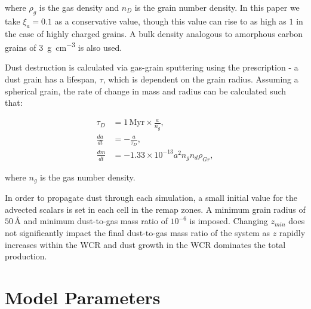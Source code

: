 \noindent
where $\rho_g$ is the gas density and $n_D$ is the grain number density.
In this paper we take $\xi_a = 0.1$ as a conservative value, though this value can rise to as high as $1$ in the case of highly charged grains.
A bulk density analogous to amorphous carbon grains of \SI{3}{\gram\per\centi\metre\cubed} is also used.

Dust destruction is calculated via gas-grain sputtering using the \textcite{draine_destruction_1979} prescription - a dust grain has a lifespan, $\tau$, which is dependent on the grain radius.
Assuming a spherical grain, the rate of change in mass and radius can be calculated such that:

\begin{subequations}
  \begin{align}
           \tau_D & = 1 \, \text{Myr} \times \frac{a}{n_g} , \\
    \frac{da}{dt} & = - \frac{a}{\tau_D} , \\
    \frac{dm}{dt} & = -1.33 \times 10^{-13} a^2 n_g n_d \rho_{Gr} ,
  \end{align}
\end{subequations}

\noindent
where $n_g$ is the gas number density.


In order to propagate dust through each simulation, a small initial value for the advected scalars is set in each cell in the remap zones.
A minimum grain radius of $50 \, \text{\AA}$ and minimum dust-to-gas mass ratio of $10^{-6}$ is imposed.
Changing $z_{min}$ does not significantly impact the final dust-to-gas mass ratio of the system as $z$ rapidly increases within the WCR and dust growth in the WCR dominates the total production.

\section{Model Parameters}

